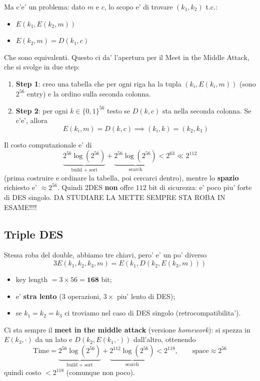 Ma c'e' un problema: dato $ m $ e $ c $, lo scopo e' di trovare $ (k_1,k_2) $ t.c.:
\begin{itemize}
  \item $ E(k_1, E(k_2,m)) $
  \item $ E(k_2, m) = D(k_1,c) $ 
\end{itemize}
Che sono equivalenti.
Questo ci da' l'apertura per il Meet in the Middle Attack, che si svolge in due step:
\begin{enumerate}
  \item \textbf{Step 1}: creo una tabella che per ogni riga ha la tupla $ (k_i, E(k_i, m)) $ (sono $ 2^{56} $ entry) e la ordino sulla seconda colonna.
  \item \textbf{Step 2}: per ogni $ k \in \{0,1\}^{56} $ testo se $ D(k,c) $ sta nella seconda colonna. Se c'e', allora
    \[
      E(k_i, m) = D(k,c) \implies (k_i,k) = (k_2,k_1)
    \]
\end{enumerate}
Il costo computazionale e' di
\[
  \underbrace{2^{56}\log(2^{56})}_{\text{build + sort}} + \underbrace{2^{56}\log(2^{56})}_{\text{search}} < 2^{63} \ll 2^{112}
\]
(prima costruire e ordinare la tabella, poi cercarci dentro), mentre lo \textbf{spazio} richiesto e' $ \approx 2^{56} $. Quindi 2DES \textbf{non} offre $ 112 $ bit di sicurezza: e' poco piu' forte di DES singolo. DA STUDIARE LA METTE SEMPRE STA ROBA IN ESAME!!!!

\subsection{Triple DES}
Stessa roba del double, abbiamo tre chiavi, pero' e' un po' diverso
\[
  3E(k_1,k_2,k_3,m) = E(k_1, D(k_2, E(k_3,m)))
\]
\begin{itemize}
  \item key length $ = 3 \times 56 = \mathbf{168} $ bit;
  \item e' \textbf{stra lento} (3 operazioni, $ 3 \times $ piu' lento di DES);
  \item se $ k_1 = k_2 = k_3 $ ci troviamo nel caso di DES singolo (retrocompatibilita').
\end{itemize}
Ci sta sempre il \textbf{meet in the middle attack} (versione \textit{homework}): si spezza in $ E(k_3,\cdot) $ da un lato e $ D(k_2, E(k_1, \cdot)) $ dall'altro, ottenendo
\[
  \text{Time} = \underbrace{2^{56}\log(2^{56})}_{\text{build + sort}} + \underbrace{2^{112}\log(2^{56})}_{\text{search}} < 2^{118}, \qquad \text{space} \approx 2^{56}
\]
quindi costo $ < 2^{118} $ (comunque non poco).

